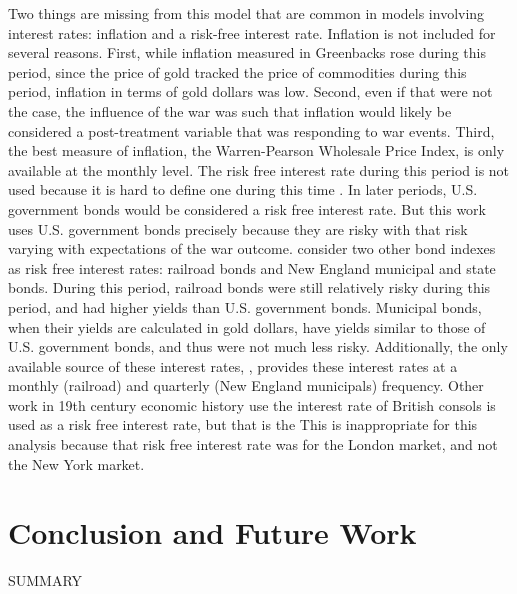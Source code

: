 Two things are missing from this model that are common in models involving interest rates: inflation and a risk-free interest rate.
Inflation is not included for several reasons.
First, while inflation measured in Greenbacks rose during this period, since the price of gold tracked the price of commodities during this period, inflation in terms of gold dollars was low\parencites{Mitchell1903}{Mitchell1908}.
Second, even if that were not the case, the influence of the war was such that inflation would likely be considered a post-treatment variable that was responding to war events.
Third, the best measure of inflation, the Warren-Pearson Wholesale Price Index, is only available at the monthly level.
The risk free interest rate during this period is not used because it is hard to define one during this time \parencites{HomerSylla2005}.
In later periods, U.S. government bonds would be considered a risk free interest rate.
But this work uses U.S. government bonds precisely because they are risky with that risk varying with expectations of the war outcome.
\textcites{Macaulay1938}{HomerSylla2005} consider two other bond indexes as risk free interest rates: railroad bonds and New England municipal and state bonds.
During this period, railroad bonds were still relatively risky during this period, and had higher yields than U.S. government bonds.
Municipal bonds, when their yields are calculated in gold dollars, have yields similar to those of U.S. government bonds, and thus were not much less risky.
Additionally, the only available source of these interest rates, \textcite{Macaulay1938}, provides these interest rates at a monthly (railroad) and quarterly (New England municipals) frequency.
Other work in 19th century economic history use the interest rate of British consols is used as a risk free interest rate, but that is the 
This is inappropriate for this analysis because that risk free interest rate was for the London market, and not the New York market.



\section{Conclusion and Future Work}
\label{bonds_battles:sec:conclusion}

SUMMARY 


